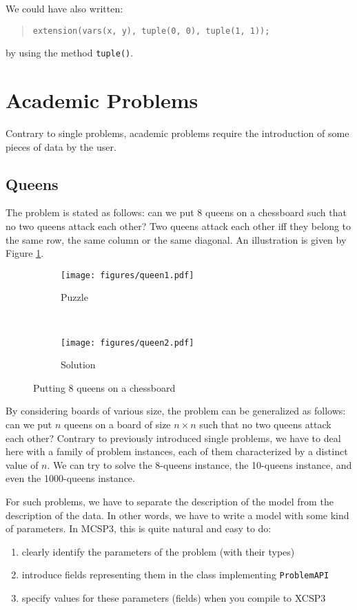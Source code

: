 \documentclass[10pt]{article}
\def\xt{{\rm XCSP3}\xspace}
\newcommand{\nn}[1]{{\tt #1}} %
\def\mt{{\rm MCSP3}\xspace}
\def\xt{{\rm XCSP3}\xspace}
\begin{document}
We could have also written:
\begin{quote}
  \verb!extension(vars(x, y), tuple(0, 0), tuple(1, 1));!
\end{quote}
by using the method \nn{tuple()}.


\section{Academic Problems}

Contrary to single problems, academic problems require the introduction of some pieces of data by the user.


\subsection{Queens}

The problem is stated as follows: can we put 8 queens on a chessboard such that no two queens attack each other?
Two queens attack each other iff they belong to the same row, the same column or the same diagonal.
An illustration is given by Figure \ref{fig:queens}.

\begin{figure}[h]
  \centering
    \begin{subfigure}[t]{0.5\textwidth}
        \centering
        \texttt{[image: figures/queen1.pdf]}
        \caption{Puzzle}
    \end{subfigure}%
    ~ 
    \begin{subfigure}[t]{0.5\textwidth}
        \centering
        \texttt{[image: figures/queen2.pdf]}
        \caption{Solution}
    \end{subfigure}
    \caption{Putting 8 queens on a chessboard \label{fig:queens}}
\end{figure}

By considering boards of various size, the problem can be generalized as follows: can we put $n$ queens on a board of size $n \times n$ such that no two queens attack each other?
Contrary to previously introduced single problems, we have to deal here with a family of problem instances, each of them characterized by a distinct value of $n$.
We can try to solve the 8-queens instance, the 10-queens instance, and even the 1000-queens instance.

For such problems, we have to separate the description of the model from the description of the data.
In other words, we have to write a model with some kind of parameters.
In \mt, this is quite natural and easy to do:
\begin{enumerate}
\item clearly identify the parameters of the problem (with their types)
\item introduce fields representing them in the class implementing \nn{ProblemAPI}
\item specify values for these parameters (fields) when you compile to \xt   
\end{enumerate}
\end{document}
